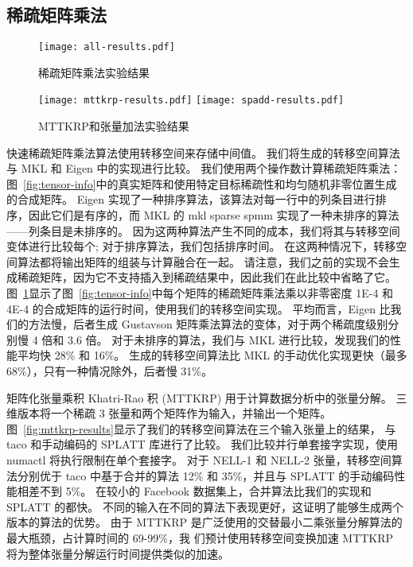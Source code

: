 \begin{translation}
\subsection{稀疏矩阵乘法}
\begin{figure}
  \centering
  \texttt{[image: all-results.pdf]}
  \caption{稀疏矩阵乘法实验结果}
  \label{fig:all-results}
\end{figure}
\begin{figure}
  \centering
    {\texttt{[image: mttkrp-results.pdf]}}
    {\texttt{[image: spadd-results.pdf]}}
  \caption{MTTKRP和张量加法实验结果}
  \label{fig:other-results}
\end{figure}

快速稀疏矩阵乘法算法使用转移空间来存储中间值。 我们将生成的转移空间算法与 MKL 和 Eigen 中的实现进行比较。 我们使用两个操作数计算稀疏矩阵乘法：图~\ref{fig:tensor-info}中的真实矩阵和使用特定目标稀疏性和均匀随机非零位置生成的合成矩阵。 Eigen 实现了一种排序算法，该算法对每一行中的列条目进行排序，因此它们是有序的，而 MKL 的 mkl sparse spmm 实现了一种未排序的算法——列条目是未排序的。
因为这两种算法产生不同的成本，我们将其与转移空间变体进行比较每个; 对于排序算法，我们包括排序时间。 在这两种情况下，转移空间算法都将输出矩阵的组装与计算融合在一起。 
请注意，我们之前的实现不会生成稀疏矩阵，因为它不支持插入到稀疏结果中，因此我们在此比较中省略了它。 图~\ref{fig:all-results}显示了图~\ref{fig:tensor-info}中每个矩阵的稀疏矩阵乘法乘以非零密度 1E-4 和 4E-4 的合成矩阵的运行时间，使用我们的转移空间实现。 
平均而言，Eigen 比我们的方法慢，后者生成 Gustavson 矩阵乘法算法的变体，对于两个稀疏度级别分别慢 4 倍和 3.6 倍。 
对于未排序的算法，我们与 MKL 进行比较，发现我们的性能平均快 28\% 和 16\%。 生成的转移空间算法比 MKL 的手动优化实现更快（最多 68\%），只有一种情况除外，后者慢 31\%。

矩阵化张量乘积 Khatri-Rao 积 (MTTKRP) 用于计算数据分析中的张量分解。 三维版本将一个稀疏 3 张量和两个矩阵作为输入，并输出一个矩阵。 图~\ref{fig:mttkrp-results}显示了我们的转移空间算法在三个输入张量上的结果，
与 taco 和手动编码的 SPLATT 库进行了比较。 我们比较并行单套接字实现，使用 numactl 将执行限制在单个套接字。
对于 NELL-1 和 NELL-2 张量，转移空间算法分别优于 taco 中基于合并的算法 12\% 和 35\%，并且与 SPLATT 的手动编码性能相差不到 5\%。 在较小的 Facebook 数据集上，合并算法比我们的实现和 SPLATT 的都快。 
不同的输入在不同的算法下表现更好，这证明了能够生成两个版本的算法的优势。 由于 MTTKRP 是广泛使用的交替最小二乘张量分解算法的最大瓶颈，占计算时间的 69-99\%，我
们预计使用转移空间变换加速 MTTKRP 将为整体张量分解运行时间提供类似的加速。


\end{translation}
